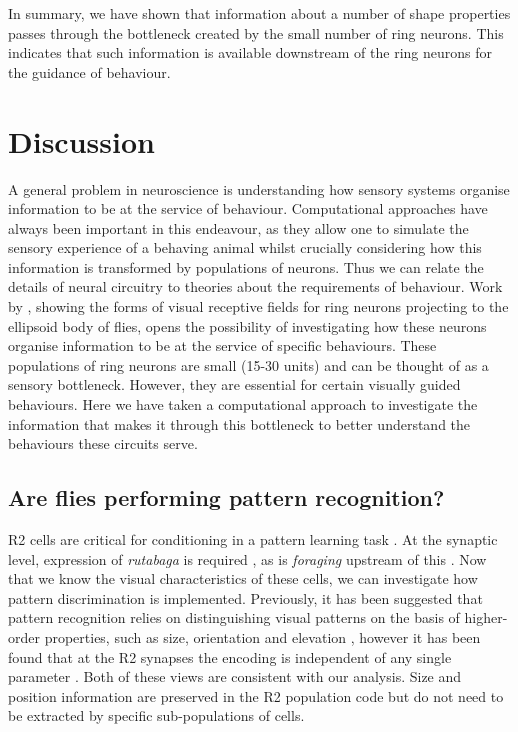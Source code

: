 \documentclass[10pt]{article}
\begin{document}
In summary, we have shown that information about a number of shape properties passes through the bottleneck created by the small number of ring neurons.
This indicates that such information is available downstream of the ring neurons for the guidance of behaviour.

\section{Discussion}
A general problem in neuroscience is understanding how sensory systems organise information to be at the service of behaviour. Computational approaches have always been important in this endeavour, as they allow one to simulate the sensory experience of a behaving animal whilst crucially considering how this information is transformed by populations of neurons. Thus we can relate the details of neural circuitry to theories about the requirements of behaviour.
Work by \cite{Seelig2013}, showing the forms of visual receptive fields for ring neurons projecting to the ellipsoid body of flies, opens the possibility of investigating how these neurons organise information to be at the service of specific behaviours. These populations of ring neurons are small (15-30 units) and can be thought of as a sensory bottleneck. However, they are essential for certain visually guided behaviours. Here we have taken a computational approach  to investigate the information that makes it through this bottleneck to better understand the behaviours these circuits serve.

\subsection{Are flies performing pattern recognition?}

R2 cells are critical for conditioning in a pattern learning task \cite{Pan2009}. At the synaptic level, expression of \emph{rutabaga} is required \cite{Pan2009}, as is \emph{foraging} upstream of this \cite{Wang2008}. Now that we know the visual characteristics of these cells, we can investigate how pattern discrimination is implemented. Previously, it has been suggested that pattern recognition relies on distinguishing visual patterns on the basis of higher-order properties, such as size, orientation and elevation \cite{Ernst1999,Pan2009}, however it has been found that at the R2 synapses the encoding is independent of any single parameter \cite{Liu2006}. Both of these views are consistent with our analysis. Size and position information are preserved in the R2 population code but do not need to be extracted by specific sub-populations of cells. 
\end{document}
